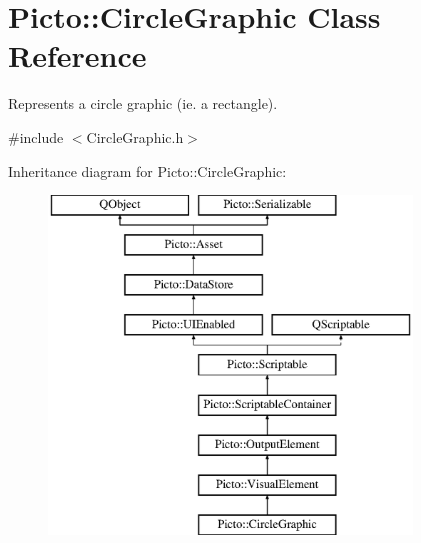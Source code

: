 \hypertarget{class_picto_1_1_circle_graphic}{\section{Picto\-:\-:Circle\-Graphic Class Reference}
\label{class_picto_1_1_circle_graphic}
}


Represents a circle graphic (ie. a rectangle).  




{\ttfamily \#include $<$Circle\-Graphic.\-h$>$}

Inheritance diagram for Picto\-:\-:Circle\-Graphic\-:\begin{figure}[H]
\begin{center}
\leavevmode
\includegraphics[height=9.000000cm]{class_picto_1_1_circle_graphic}
\end{center}
\end{figure}
